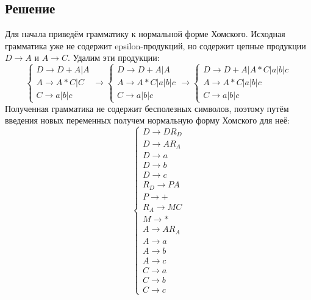 \documentclass[11pt]{article}
\begin{document}
\subsection{Решение}
\label{sec:org14d41b9}
Для начала приведём грамматику к нормальной форме Хомского. Исходная грамматика уже не
содержит epsilon-продукций, но содержит цепные продукции \(D \rightarrow A\) и \(A \rightarrow C\).
Удалим эти продукции:
\begin{equation*}
\begin{cases}
D \rightarrow D + A | A \\
A \rightarrow A * C | C \\
C \rightarrow a | b | c
\end{cases}
\rightarrow
\begin{cases}
D \rightarrow D + A | A \\
A \rightarrow A * C | a | b | c \\
C \rightarrow a | b | c
\end{cases}
\rightarrow
\begin{cases}
D \rightarrow D + A | A * C | a | b | c \\
A \rightarrow A * C | a | b | c \\
C \rightarrow a | b | c
\end{cases}
\end{equation*}
Полученная грамматика не содержит бесполезных символов, поэтому путём введения новых переменных
получем нормальную форму Хомского для неё:
\begin{equation*}
\begin{cases}
D \rightarrow DR_D \\
D \rightarrow AR_A \\
D \rightarrow a \\
D \rightarrow b \\
D \rightarrow c \\
R_D \rightarrow PA \\
P \rightarrow + \\
R_A \rightarrow MC \\
M \rightarrow * \\
A \rightarrow AR_A \\
A \rightarrow a \\
A \rightarrow b \\
A \rightarrow c \\
C \rightarrow a \\
C \rightarrow b \\
C \rightarrow c
\end{cases}
\end{equation*}
\end{document}
